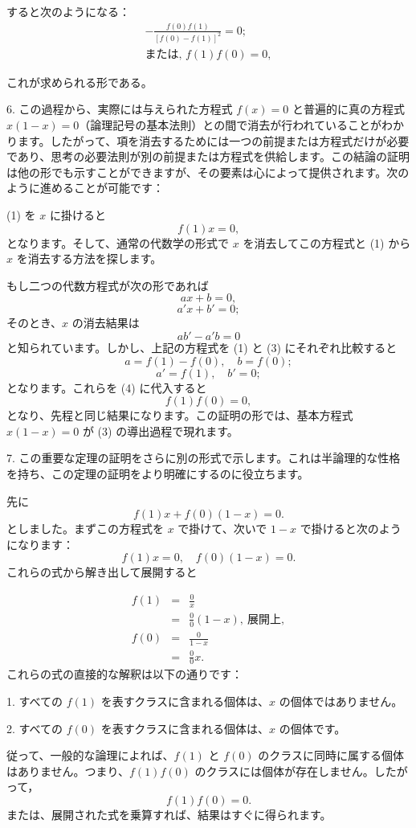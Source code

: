 \documentclass[a4paper,11pt,openany]{ltjsbook}
\begin{document}
すると次のようになる：
\begin{eqnarray}
-\frac{f(0)f(1)}{[f(0) - f(1)]^2} = 0; \nonumber \\
\textrm{または, }
f(1)f(0) = 0,
\end{eqnarray}

これが求められる形である。

6. この過程から、実際には与えられた方程式 $f(x) = 0$ と普遍的に真の方程式 $x(1 - x) = 0$（論理記号の基本法則）との間で消去が行われていることがわかります。したがって、項を消去するためには一つの前提または方程式だけが必要であり、思考の必要法則が別の前提または方程式を供給します。この結論の証明は他の形でも示すことができますが、その要素は心によって提供されます。次のように進めることが可能です：

(1) を $x$ に掛けると
\[
f(1)x = 0,
\]
となります。そして、通常の代数学の形式で $x$ を消去してこの方程式と (1) から $x$ を消去する方法を探します。

もし二つの代数方程式が次の形であれば
\[
ax + b = 0,
\]
\[
a'x + b' = 0;
\]
そのとき、$x$ の消去結果は
\[
ab' - a'b = 0
\]
と知られています。しかし、上記の方程式を (1) と (3) にそれぞれ比較すると
\[
a = f(1) - f(0), \quad b = f(0);
\]
\[
a' = f(1), \quad b' = 0;
\]
となります。これらを (4) に代入すると
\[
f(1)f(0) = 0,
\]
となり、先程と同じ結果になります。この証明の形では、基本方程式 $x(1 - x) = 0$ が (3) の導出過程で現れます。

7. この重要な定理の証明をさらに別の形式で示します。これは半論理的な性格を持ち、この定理の証明をより明確にするのに役立ちます。

先に
\[
f(1)x + f(0)(1 - x) = 0.
\]
としました。まずこの方程式を $x$ で掛けて、次いで $1 - x$ で掛けると次のようになります：
\[
f(1)x = 0, \quad f(0)(1 - x) = 0.
\]
これらの式から解き出して展開すると

\begin{eqnarray*}
     f(1) &=& \frac{0}{x} \\
          &=& \frac{0}{0}(1-x),\:\textrm{展開上},\\
     f(0) &=& \frac{0}{1-x} \\
          &=& \frac{0}{0}x.
\end{eqnarray*}
これらの式の直接的な解釈は以下の通りです：

1. すべての $f(1)$ を表すクラスに含まれる個体は、$x$ の個体ではありません。

2. すべての $f(0)$ を表すクラスに含まれる個体は、$x$ の個体です。

従って、一般的な論理によれば、$f(1)$ と $f(0)$ のクラスに同時に属する個体はありません。つまり、$f(1)f(0)$ のクラスには個体が存在しません。したがって，
\[
     f(1)f(0) = 0.
\]
または、展開された式を乗算すれば、結果はすぐに得られます。
\end{document}
